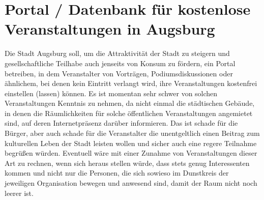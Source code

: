   \section{Portal / Datenbank für kostenlose Veranstaltungen in Augsburg}
  
  Die Stadt Augsburg soll, um die Attraktivität der Stadt zu steigern und 
  gesellschaftliche Teilhabe auch jenseits von Konsum zu fördern, ein Portal 
  betreiben, in dem Veranstalter von Vorträgen, Podiumsdiskussionen oder 
  ähnlichem, bei denen kein Eintritt verlangt wird, ihre Veranstaltungen 
  kostenfrei einstellen (lassen) können. Es ist momentan sehr schwer von 
  solchen Veranstaltungen Kenntnis zu nehmen, da nicht einmal die städtischen 
  Gebäude, in denen die Räumlichkeiten für solche öffentlichen 
  Veranstaltungen angemietet sind, auf deren Internetpräsenz darüber 
  informieren. Das ist schade für die Bürger, aber auch schade für die 
  Veranstalter die unentgeltlich einen Beitrag zum kulturellen Leben der 
  Stadt leisten wollen und sicher auch eine regere Teilnahme begrüßen würden. 
  Eventuell wäre mit einer Zunahme von Veranstaltungen dieser Art zu rechnen, 
  wenn sich heraus stellen würde, dass stets genug Interessenten kommen und 
  nicht nur die Personen, die sich sowieso im Dunstkreis der jeweiligen 
  Organisation bewegen und anwesend sind, damit der Raum nicht noch leerer 
  ist.